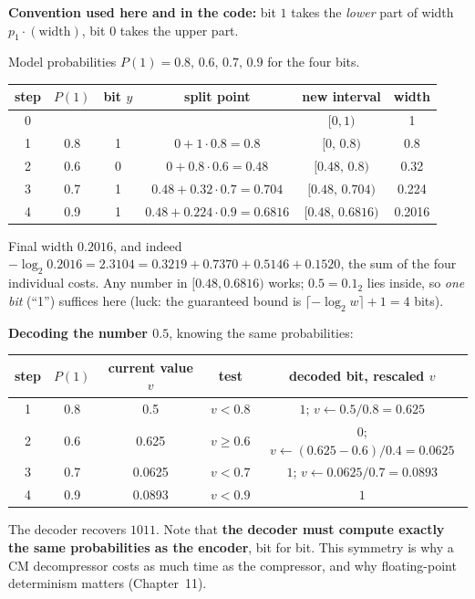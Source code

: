 \documentclass[11pt,a4paper,openany]{book}
\theoremstyle{definition}
\theoremstyle{remark}
\begin{document}
\textbf{Convention used here and in the code:} bit $1$ takes the \emph{lower} part of width $p_1\cdot(\text{width})$, bit $0$ takes the upper part.

\begin{example}
Model probabilities $P(1)=0.8,\,0.6,\,0.7,\,0.9$ for the four bits.
\begin{center}
\begin{tabular}{@{}cccccc@{}}
\toprule
step & $P(1)$ & bit $y$ & split point & new interval & width\\
\midrule
0 & & & & $[0,1)$ & 1\\
1 & 0.8 & 1 & $0+1\cdot0.8=0.8$ & $[0,\,0.8)$ & 0.8\\
2 & 0.6 & 0 & $0+0.8\cdot0.6=0.48$ & $[0.48,\,0.8)$ & 0.32\\
3 & 0.7 & 1 & $0.48+0.32\cdot0.7=0.704$ & $[0.48,\,0.704)$ & 0.224\\
4 & 0.9 & 1 & $0.48+0.224\cdot0.9=0.6816$ & $[0.48,\,0.6816)$ & 0.2016\\
\bottomrule
\end{tabular}
\end{center}
Final width $0.2016$, and indeed $-\log_2 0.2016=2.3104=0.3219+0.7370+0.5146+0.1520$, the sum of the four individual costs. Any number in $[0.48,0.6816)$ works; $0.5=0.1_2$ lies inside, so \emph{one bit} (``1'') suffices here (luck: the guaranteed bound is $\lceil-\log_2 w\rceil+1=4$ bits).

\textbf{Decoding the number $0.5$}, knowing the same probabilities:
\begin{center}
\begin{tabular}{@{}ccccc@{}}
\toprule
step & $P(1)$ & current value $v$ & test & decoded bit, rescaled $v$\\
\midrule
1 & 0.8 & 0.5 & $v<0.8$ & $1$; $v\leftarrow 0.5/0.8=0.625$\\
2 & 0.6 & 0.625 & $v\ge0.6$ & $0$; $v\leftarrow(0.625-0.6)/0.4=0.0625$\\
3 & 0.7 & 0.0625 & $v<0.7$ & $1$; $v\leftarrow0.0625/0.7=0.0893$\\
4 & 0.9 & 0.0893 & $v<0.9$ & $1$\\
\bottomrule
\end{tabular}
\end{center}
The decoder recovers $1011$. Note that \textbf{the decoder must compute exactly the same probabilities as the encoder}, bit for bit. This symmetry is why a CM decompressor costs as much time as the compressor, and why floating-point determinism matters (Chapter~11).
\end{example}
\end{document}
